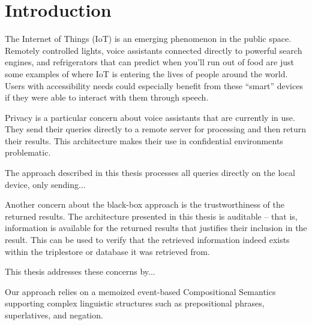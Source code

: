 \documentclass[../main.tex]{subfiles}
\begin{document}
\chapter{Introduction}
\begin{refsection}

\label{chapter:intro}




The Internet of Things (IoT) is an emerging phenomenon in the public space.  Remotely controlled lights,
voice assistants connected directly to powerful search engines, and refrigerators that can predict
when you'll run out of food are just some examples of where IoT is entering the lives of people around the world.  Users with accessibility needs could especially benefit from these ``smart'' devices if they were able to interact with them through speech.

Privacy is a particular concern about voice assistants that are currently in use.  They send
their queries directly to a remote server for processing and then return their results.
This architecture makes their use in confidential environments problematic.

The approach described in this thesis processes all queries directly on the local device,
only sending...

Another concern about the black-box approach is the trustworthiness of the returned results.
The architecture presented in this thesis is auditable -- that is, information is available
for the returned results that justifies their inclusion in the result.  This can be used to
verify that the retrieved information indeed exists within the triplestore or database it was
retrieved from.

This thesis addresses these concerns by...

Our approach relies on a memoized event-based Compositional Semantics supporting complex linguistic structures such as prepositional phrases, superlatives, and negation.



%



\end{refsection}
\end{document}
